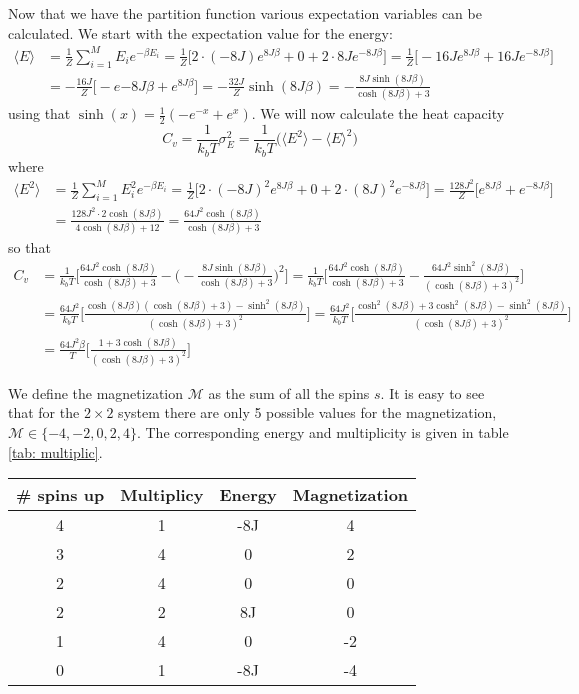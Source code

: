 \documentclass[11pt,a4wide]{article}
\begin{document}
Now that we have the partition function various expectation variables can be calculated. We start with the expectation value for the energy:
\begin{align*}
\langle E \rangle &= \frac{1}{Z} \sum_{i=1}^M E_ie^{-\beta E_i} = \frac{1}{Z} \big[ 2\cdot (-8J)e^{8J\beta} + 0 + 2\cdot 8Je^{-8J\beta}\big] = \frac{1}{Z} \big[-16Je^{8J\beta} + 16Je^{-8J\beta}\big] \\
&= -\frac{16J}{Z}\big[-e{-8J\beta} + e^{8J\beta}\big] = -\frac{32J}{Z}\sinh(8J\beta) = -\frac{8J\sinh(8J\beta)}{\cosh(8J\beta) + 3}
\end{align*}
using that $\sinh(x) = \frac{1}{2}(-e^{-x} + e^x)$. We will now calculate the heat capacity 
\[
C_v = \frac{1}{k_bT}\sigma_E^2 =  \frac{1}{k_bT}\big(\langle E^2 \rangle - \langle E \rangle^2\big)
\]
where
\begin{align*}
\langle E^2 \rangle &= \frac{1}{Z} \sum_{i=1}^M E_i^2 e^{-\beta E_i} = \frac{1}{Z} \big[ 2\cdot (-8J)^2 e^{8J\beta} + 0 + 2\cdot (8J)^2 e^{-8J\beta}\big] = \frac{128J^2}{Z} \big[ e^{8J\beta} + e^{-8J\beta}\big] \\
&= \frac{128J^2 \cdot 2\cosh(8J\beta)}{4\cosh(8J\beta) + 12} =  \frac{64J^2 \cosh(8J\beta)}{\cosh(8J\beta) + 3}
\end{align*}
so that 
\begin{align*}
C_v &= \frac{1}{k_bT}\bigg[ \frac{64J^2 \cosh(8J\beta)}{\cosh(8J\beta) + 3} - \bigg(  -\frac{8J\sinh(8J\beta)}{\cosh(8J\beta) + 3} \bigg)^2 \bigg] = \frac{1}{k_bT}\bigg[ \frac{64J^2 \cosh(8J\beta)}{\cosh(8J\beta) + 3} - \frac{64J^2 \sinh^2(8J\beta)}{(\cosh(8J\beta) + 3)^2} \bigg] \\
&= \frac{64J^2}{k_bT}\bigg[ \frac{ \cosh(8J\beta)(\cosh(8J\beta) + 3)-  \sinh^2(8J\beta)}{(\cosh(8J\beta) + 3)^2} \bigg] = \frac{64J^2}{k_bT}\bigg[ \frac{\cosh^2(8J\beta) + 3\cosh^2(8J\beta) - \sinh^2(8J\beta)}{(\cosh(8J\beta) + 3)^2} \bigg] \\
&= \frac{64J^2\beta}{T} \bigg[\frac{1 + 3\cosh(8J\beta)}{(\cosh(8J\beta) + 3)^2} \bigg]
\end{align*}

We define the magnetization $\mathcal{M}$ as the sum of all the spins $s$. It is easy to see that for the $2\times 2$ system there are only 5 possible values for the magnetization, $\mathcal{M} \in \{-4, -2, 0, 2, 4\}$.  The corresponding energy and multiplicity is given in table \ref{tab: multiplic}. 

\begin{tabular}{|c|c|c|c|}
\hline 
\# spins up & Multiplicy & Energy & Magnetization \\ 
\hline 
4 & 1 & -8J & 4 \\ 
\hline 
3 & 4 & 0 & 2 \\ 
\hline 
2 & 4 & 0 & 0 \\ 
\hline 
2 & 2 & 8J & 0 \\ 
\hline 
1 & 4 & 0 & -2 \\ 
\hline 
0 & 1 & -8J & -4 \\ 
\hline 
\end{tabular} \label{tab: multiplic}
\end{document}
